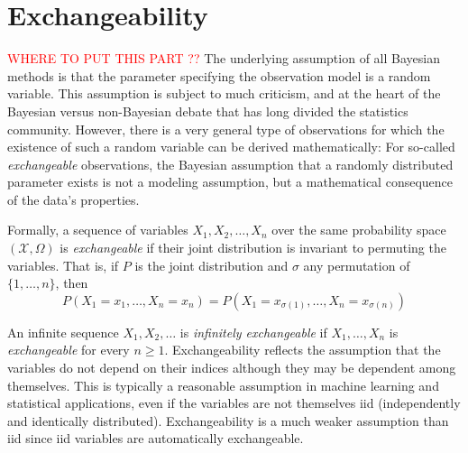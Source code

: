 
\section{Exchangeability}
\textcolor{red}{WHERE TO PUT THIS PART ??}
The underlying assumption of all Bayesian methods is that the parameter specifying the observation model is a random variable. This assumption is subject to much criticism, and at the heart of the Bayesian versus non-Bayesian debate that has long divided the statistics community. However, there is a very general type of observations for which the existence of such a random variable can be derived mathematically: For so-called \textit{exchangeable} observations, the Bayesian assumption that a randomly distributed parameter exists is not a modeling assumption, but a mathematical consequence of the data’s properties.

Formally, a sequence of variables $X_1,X_2,\dots,X_n$ over the same probability space $(\mathcal{X},\Omega)$ is \textit{exchangeable} if their joint distribution is invariant to permuting the variables. That is, if $P$ is the joint distribution and $\sigma$ any permutation of $\{1,\dots,n\}$, then
$$ P(X_1=x_1,\dots,X_n=x_n) = P(X_1=x_{\sigma(1)},\dots,X_n=x_{\sigma(n)}) $$

An infinite sequence $X_1,X_2,\dots$ is \textit{infinitely exchangeable} if $X_1,\dots,X_n$ is \textit{exchangeable} for every $n \ge 1$. Exchangeability reflects the assumption that the variables do not depend on their indices although they may be dependent among themselves. This is typically a reasonable assumption in machine learning and statistical applications, even if the variables are not themselves iid (independently and identically distributed). Exchangeability is a much weaker assumption than iid since iid variables are automatically exchangeable.

